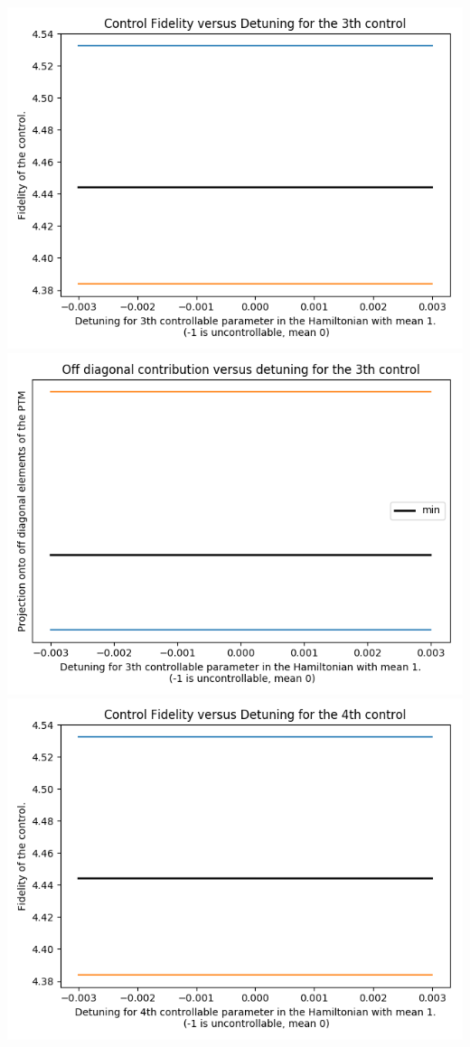 \documentclass{article}
\begin{document}
\begin{center}
\includegraphics[scale=.9]{control_fid_4}
\includegraphics[scale=.9]{off_diag_4}
\includegraphics[scale=.9]{control_fid_5}

\end{center}
\end{document}
